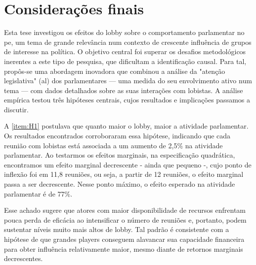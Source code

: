\chapter{Considerações finais}
\label{chapter:considfinal}

Esta tese investigou os efeitos do lobby sobre o comportamento parlamentar no \acrshort{pe}, um tema de grande relevância num contexto de crescente influência de grupos de interesse na política. O objetivo central foi superar os desafios metodológicos inerentes a este tipo de pesquisa, que dificultam a identificação causal. Para tal, propôs-se uma abordagem inovadora que combinou a análise da "atenção legislativa" (\acrshort{al}) dos parlamentares — uma medida do seu envolvimento ativo num tema — com dados detalhados sobre as suas interações com lobistas. A análise empírica testou três hipóteses centrais, cujos resultados e implicações passamos a discutir.

A \ref{item:H1} postulava que quanto maior o lobby, maior a atividade parlamentar. Os resultados encontrados corroboraram essa hipótese, indicando que cada reunião com lobistas está associada a um aumento de 2,5\% na atividade parlamentar. Ao testarmos os efeitos marginais, na especificação quadrática, encontramos um efeito marginal decrescente - ainda que pequeno -, cujo ponto de inflexão foi em 11,8 reuniões, ou seja, a partir de 12 reuniões, o efeito marginal passa a ser decrescente. Nesse ponto máximo, o efeito esperado na atividade parlamentar é de 77\%. 

Esse achado sugere que atores com maior disponibilidade de recursos enfrentam pouca perda de eficácia ao intensificar o número 
de reuniões e, portanto, podem sustentar níveis muito mais altos de lobby. Tal padrão é consistente com a hipótese de que 
grandes players conseguem alavancar sua capacidade financeira para obter influência relativamente maior, mesmo diante de 
retornos marginais decrescentes.


